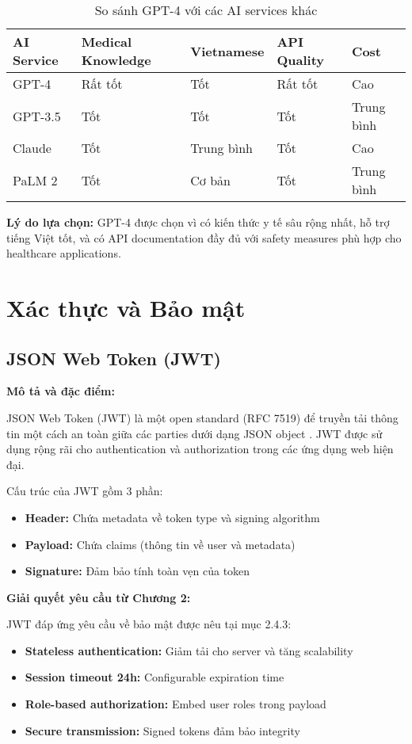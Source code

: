 \documentclass[../DoAn.tex]{subfiles}
\begin{document}
\begin{table}[H]
\centering
\begin{tabular}{|p{3cm}|p{2.5cm}|p{2.5cm}|p{2.5cm}|p{2.5cm}|}
\hline
\textbf{AI Service} & \textbf{Medical Knowledge} & \textbf{Vietnamese} & \textbf{API Quality} & \textbf{Cost} \\
\hline
GPT-4 & Rất tốt & Tốt & Rất tốt & Cao \\
\hline
GPT-3.5 & Tốt & Tốt & Tốt & Trung bình \\
\hline
Claude & Tốt & Trung bình & Tốt & Cao \\
\hline
PaLM 2 & Tốt & Cơ bản & Tốt & Trung bình \\
\hline
\end{tabular}
\caption{So sánh GPT-4 với các AI services khác}
\end{table}

\textbf{Lý do lựa chọn:} GPT-4 được chọn vì có kiến thức y tế sâu rộng nhất, hỗ trợ tiếng Việt tốt, và có API documentation đầy đủ với safety measures phù hợp cho healthcare applications.

\section{Xác thực và Bảo mật}
\label{section:3.5}

\subsection{JSON Web Token (JWT)}
\label{subsection:3.5.1}

\textbf{Mô tả và đặc điểm:}

JSON Web Token (JWT) là một open standard (RFC 7519) để truyền tải thông tin một cách an toàn giữa các parties dưới dạng JSON object \cite{jwt}. JWT được sử dụng rộng rãi cho authentication và authorization trong các ứng dụng web hiện đại.

Cấu trúc của JWT gồm 3 phần:
\begin{itemize}
    \item \textbf{Header:} Chứa metadata về token type và signing algorithm
    \item \textbf{Payload:} Chứa claims (thông tin về user và metadata)
    \item \textbf{Signature:} Đảm bảo tính toàn vẹn của token
\end{itemize}

\textbf{Giải quyết yêu cầu từ Chương 2:}

JWT đáp ứng yêu cầu về bảo mật được nêu tại mục 2.4.3:
\begin{itemize}
    \item \textbf{Stateless authentication:} Giảm tải cho server và tăng scalability
    \item \textbf{Session timeout 24h:} Configurable expiration time
    \item \textbf{Role-based authorization:} Embed user roles trong payload
    \item \textbf{Secure transmission:} Signed tokens đảm bảo integrity
\end{itemize}
\end{document}
